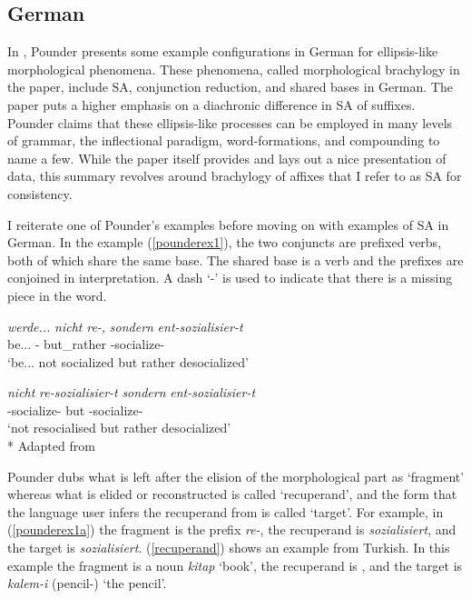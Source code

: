 \subsection{German}

In \cite{pounder2006broken}, Pounder presents some example configurations in German for ellipsis-like morphological phenomena. These phenomena, called morphological brachylogy in the paper, include SA, conjunction reduction, and shared bases in German. The paper puts a higher emphasis on a diachronic difference in SA of suffixes. Pounder claims that these ellipsis-like processes can be employed in many levels of grammar, the inflectional paradigm, word-formations, and compounding to name a few. While the paper itself provides and lays out a nice presentation of data, this summary revolves around brachylogy of affixes that I refer to as SA for consistency.

I reiterate one of Pounder's examples before moving on with examples of SA in German. In the example (\ref{pounderex1}), the two conjuncts are prefixed verbs, both of which share the same base. The shared base is a verb and the prefixes are conjoined in interpretation. A dash `-' is used to indicate that there is a missing piece in the word. 

\begin{exe}
    \ex \label{pounderex1}
    \begin{xlist}
        \ex \label{pounderex1a} 
        \gll 
        \textit{werde...} \textit{nicht} \textit{re-,} \textit{sondern} \textit{ent-sozialisier-t} \\ be... {\Neg} {\Pref}- but\_rather {\Pref}-socialize-{\Part} \\
        \glt `be... not socialized but rather desocialized'
    
        \ex \label{pounderex1b}
        \gll 
        \textit{nicht} \textit{re-sozialisier-t} \textit{sondern} \textit{ent-sozialisier-t} \\ {\Neg} {\Pref}-socialize-{\Part} but {\Pref}-socialize-{\Part} \\
        \glt `not resocialised but rather desocialized'\\*
        \hfill Adapted from \cite{pounder2006broken}
    \end{xlist}
\end{exe}

Pounder dubs what is left after the elision of the morphological part as `fragment' whereas what is elided or reconstructed is called `recuperand', and the form that the language user infers the recuperand from is called `target'. For example, in (\ref{pounderex1a}) the fragment is the prefix \textit{re-}, the recuperand is \textit{sozialisiert}, and the target is \textit{sozialisiert}. (\ref{recuperand}) shows an example from Turkish. In this example the fragment is a noun \textit{kitap} `book', the recuperand is {\Acc}, and the target is \textit{kalem-i} (pencil-{\Acc}) `the pencil'.

